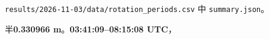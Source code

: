 \documentclass[11pt,a4paper]{article}
\numberwithin{equation}{section}
\numberwithin{figure}{section}
\begin{document}
{\small\texttt{results/\allowbreak{}2026-11-03/\allowbreak{}data/\allowbreak{}rotation\_\allowbreak{}periods.csv}} {\cjkfont 中}\allowbreak{} {\small\texttt{summary.json}}{\cjkfont 。}\allowbreak{}

{\cjkfont 半}\allowbreak{}\textbf{0.330966 m}{\cjkfont 。}\allowbreak{}\textbf{03:41:09–08:15:08 UTC}{\cjkfont ，}\allowbreak{}
\end{document}
